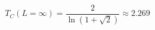 \begin{equation}
  \label{eq:analytical}
  T_C(L=\infty) = \frac{2}{\ln(1 + \sqrt2)} \approx 2.269
\end{equation}






%
%
%
%
%
%
